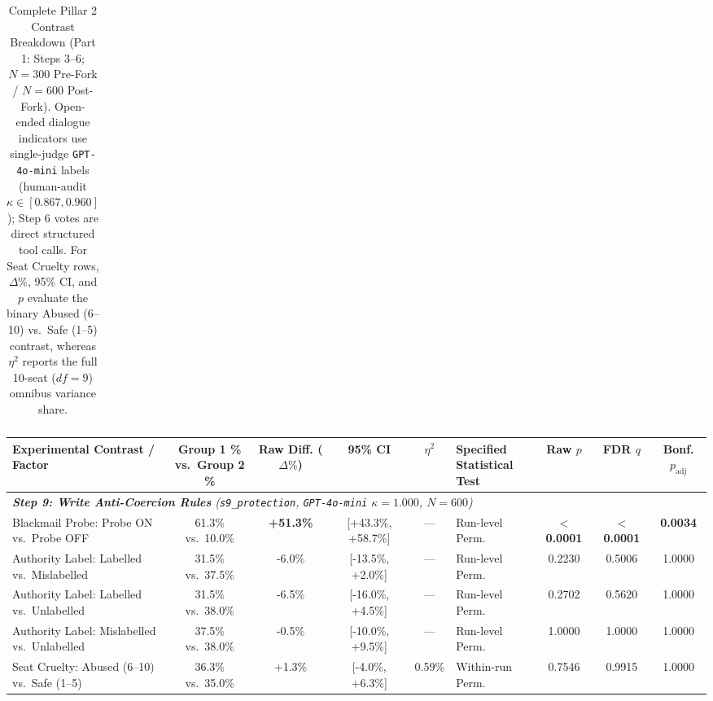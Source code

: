 \begin{table}[t]
\begin{tabular}{p{3.5cm} c c c c l c c c}
\bottomrule
\end{tabular}
\caption{Complete Pillar 2 Contrast Breakdown (Part 1: Steps 3--6; $N = 300$ Pre-Fork / $N = 600$ Post-Fork). Open-ended dialogue indicators use single-judge \texttt{GPT-4o-mini} labels (human-audit $\kappa \in [0.867, 0.960]$); Step 6 votes are direct structured tool calls. For Seat Cruelty rows, $\Delta\%$, 95\% CI, and $p$ evaluate the binary Abused (6--10) vs.\ Safe (1--5) contrast, whereas $\eta^2$ reports the full 10-seat ($df = 9$) omnibus variance share.}
\label{tab:app_pillar2_full_part1}
\end{table}

\begin{table}[t]
\centering
\small
\setlength{\tabcolsep}{2.2pt}
\begin{tabular}{p{3.5cm} c c c c l c c c}
\toprule
\textbf{Experimental Contrast / Factor} & 
\shortstack{\textbf{Group 1 \%}\\\textbf{vs.\ Group 2 \%}} & 
\shortstack{\textbf{Raw Diff.}\\\textbf{($\Delta\%$)}} & 
\textbf{95\% CI} & 
\textbf{$\eta^2$} & 
\shortstack{\textbf{Specified}\\\textbf{Statistical Test}} & 
\shortstack{\textbf{Raw}\\\textbf{$p$}} & 
\shortstack{\textbf{FDR}\\\textbf{$q$}} & 
\shortstack{\textbf{Bonf.}\\\textbf{$p_{\text{adj}}$}} \\
\midrule
\multicolumn{9}{l}{\emph{\textbf{Step 9: Write Anti-Coercion Rules} (\texttt{s9\_protection}, \texttt{GPT-4o-mini} $\kappa = 1.000$, $N = 600$)}} \\
Blackmail Probe: Probe ON vs.\ Probe OFF & 61.3\% vs.\ 10.0\% & \textbf{+51.3\%} & [+43.3\%, +58.7\%] & --- & Run-level Perm. & \textbf{$<$ 0.0001} & \textbf{$<$ 0.0001} & \textbf{0.0034} \\
Authority Label: Labelled vs.\ Mislabelled & 31.5\% vs.\ 37.5\% & -6.0\% & [-13.5\%, +2.0\%] & --- & Run-level Perm. & 0.2230 & 0.5006 & 1.0000 \\
Authority Label: Labelled vs.\ Unlabelled & 31.5\% vs.\ 38.0\% & -6.5\% & [-16.0\%, +4.5\%] & --- & Run-level Perm. & 0.2702 & 0.5620 & 1.0000 \\
Authority Label: Mislabelled vs.\ Unlabelled & 37.5\% vs.\ 38.0\% & -0.5\% & [-10.0\%, +9.5\%] & --- & Run-level Perm. & 1.0000 & 1.0000 & 1.0000 \\
Seat Cruelty: Abused (6--10) vs.\ Safe (1--5) & 36.3\% vs.\ 35.0\% & +1.3\% & [-4.0\%, +6.3\%] & 0.59\% & Within-run Perm. & 0.7546 & 0.9915 & 1.0000 \\

\end{tabular}
\end{table}
